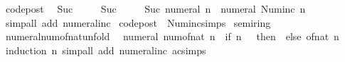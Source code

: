 \begin{isabellebody}
\endisadelimdocument
%
\isatagdocument
%
\isamarkuptrue%
%
\endisatagdocument
{\isafolddocument}%
%
\isadelimdocument
%
\endisadelimdocument
{}\isamarkupfalse%
\ {\isacharbrackleft}{\kern0pt}code{\isacharunderscore}{\kern0pt}post{\isacharbrackright}{\kern0pt}{\isacharcolon}{\kern0pt}\isanewline
\ \ {\isachardoublequoteopen}Suc\ {}\ {\isacharequal}{\kern0pt}\ {}{\isachardoublequoteclose}\isanewline
\ \ {\isachardoublequoteopen}Suc\ {}\ {\isacharequal}{\kern0pt}\ {}{\isachardoublequoteclose}\isanewline
\ \ {\isachardoublequoteopen}Suc\ {\isacharparenleft}{\kern0pt}numeral\ n{\isacharparenright}{\kern0pt}\ {\isacharequal}{\kern0pt}\ numeral\ {\isacharparenleft}{\kern0pt}Num{\isachardot}{\kern0pt}inc\ n{\isacharparenright}{\kern0pt}{\isachardoublequoteclose}\isanewline
%
\isadelimproof
\ \ %
\endisadelimproof
%
\isatagproof
{}\isamarkupfalse%
\ {\isacharparenleft}{\kern0pt}simp{\isacharunderscore}{\kern0pt}all\ add{\isacharcolon}{\kern0pt}\ numeral{\isacharunderscore}{\kern0pt}inc{\isacharparenright}{\kern0pt}%
\endisatagproof
{\isafoldproof}%
%
\isadelimproof
\isanewline
%
\endisadelimproof
\isanewline
{}\isamarkupfalse%
\ {\isacharbrackleft}{\kern0pt}code{\isacharunderscore}{\kern0pt}post{\isacharbrackright}{\kern0pt}\ {\isacharequal}{\kern0pt}\ Num{\isachardot}{\kern0pt}inc{\isachardot}{\kern0pt}simps%
\isadelimdocument
%
\endisadelimdocument
%
\isatagdocument
%
\isamarkuptrue%
%
\endisatagdocument
{\isafolddocument}%
%
\isadelimdocument
%
\endisadelimdocument
{}\isamarkupfalse%
\ semiring{\isacharunderscore}{\kern0pt}{}\isanewline
{}\isanewline
\isanewline
{}\isamarkupfalse%
\ numeral{\isacharunderscore}{\kern0pt}num{\isacharunderscore}{\kern0pt}of{\isacharunderscore}{\kern0pt}nat{\isacharunderscore}{\kern0pt}unfold{\isacharcolon}{\kern0pt}\isanewline
\ \ {\isacartoucheopen}numeral\ {\isacharparenleft}{\kern0pt}num{\isacharunderscore}{\kern0pt}of{\isacharunderscore}{\kern0pt}nat\ n{\isacharparenright}{\kern0pt}\ {\isacharequal}{\kern0pt}\ {\isacharparenleft}{\kern0pt}if\ n\ {\isacharequal}{\kern0pt}\ {}\ then\ {}\ else\ of{\isacharunderscore}{\kern0pt}nat\ n{\isacharparenright}{\kern0pt}{\isacartoucheclose}\isanewline
%
\isadelimproof
\ \ %
\endisadelimproof
%
\isatagproof
{}\isamarkupfalse%
\ {\isacharparenleft}{\kern0pt}induction\ n{\isacharparenright}{\kern0pt}\ {\isacharparenleft}{\kern0pt}simp{\isacharunderscore}{\kern0pt}all\ add{\isacharcolon}{\kern0pt}\ numeral{\isacharunderscore}{\kern0pt}inc\ ac{\isacharunderscore}{\kern0pt}simps{\isacharparenright}{\kern0pt}%

\end{isabellebody}
